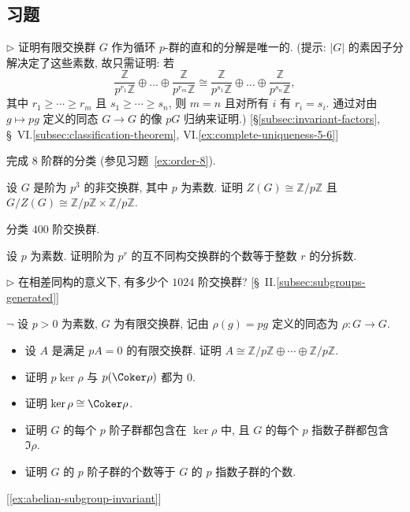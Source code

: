 \subsection*{习题}
{}

\begin{prob}
\label{ex:abelian-unique-decomp}
$\triangleright$ 证明有限交换群 $G$ 作为循环 $p$-群的直和的分解是唯一的. (提示: $|G|$ 的素因子分解决定了这些素数, 故只需证明: 若
\[
\frac{\mathbb{Z}}{p^{r_1}\mathbb{Z}} \oplus \dots \oplus \frac{\mathbb{Z}}{p^{r_m}\mathbb{Z}} \cong \frac{\mathbb{Z}}{p^{s_1}\mathbb{Z}} \oplus \dots \oplus \frac{\mathbb{Z}}{p^{s_n}\mathbb{Z}},
\]
其中 $r_1 \geq \cdots \geq r_m$ 且 $s_1 \geq \cdots \geq s_n$, 则 $m = n$ 且对所有 $i$ 有 $r_i = s_i$. 通过对由 $g \mapsto p g$ 定义的同态 $G \to G$ 的像 $pG$ 归纳来证明.) [\S\ref{subsec:invariant-factors}, \S~VI.\ref{subsec:classification-theorem}, VI.\ref{ex:complete-uniqueness-5-6}]
\end{prob}

\begin{prob}
\label{ex:order8-classify}
完成 $8$ 阶群的分类 (参见习题~\ref{ex:order-8}).
\end{prob}

\begin{prob}
\label{ex:p3-noncomm-center}
设 $G$ 是阶为 $p^3$ 的非交换群, 其中 $p$ 为素数. 证明 $Z(G) \cong \mathbb{Z}/p\mathbb{Z}$ 且 $G/Z(G) \cong \mathbb{Z}/p\mathbb{Z} \times \mathbb{Z}/p\mathbb{Z}$.
\end{prob}

\begin{prob}
\label{ex:abelian-order-400}
分类 $400$ 阶交换群.
\end{prob}

\begin{prob}
\label{ex:abelian-p^r-partitions}
设 $p$ 为素数. 证明阶为 $p^r$ 的互不同构交换群的个数等于整数 $r$ 的分拆数.
\end{prob}

\begin{prob}
\label{ex:abelian-order-1024}
$\triangleright$ 在相差同构的意义下, 有多少个 $1024$ 阶交换群? [\S~II.\ref{subsec:subgroups-generated}]
\end{prob}

\begin{prob}
\label{ex:abelian-p-map}
$\neg$ 设 $p > 0$ 为素数, $G$ 为有限交换群, 记由 $\rho(g) = p g$ 定义的同态为 $\rho : G \to G$.
\begin{itemize}
\item 设 $A$ 是满足 $pA = 0$ 的有限交换群. 证明 $A \cong \mathbb{Z}/p\mathbb{Z} \oplus \cdots \oplus \mathbb{Z}/p\mathbb{Z}$.
\item 证明 $p \ker \rho$ 与 $p(\Coker \rho)$ 都为 $0$.
\item 证明 $\ker \rho \cong \Coker \rho$.
\item 证明 $G$ 的每个 $p$ 阶子群都包含在 $\ker \rho$ 中, 且 $G$ 的每个 $p$ 指数子群都包含 $\Im \rho$.
\item 证明 $G$ 的 $p$ 阶子群的个数等于 $G$ 的 $p$ 指数子群的个数.
\end{itemize}
[\ref{ex:abelian-subgroup-invariant}]
\end{prob}

